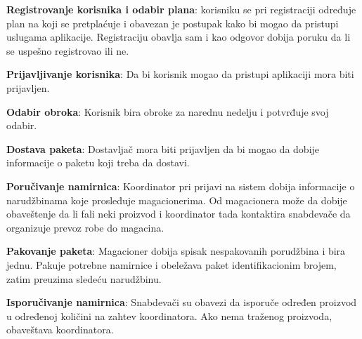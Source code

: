 	\textbf{Registrovanje korisnika i odabir plana}: korisniku se pri registraciji određuje plan na koji se pretplaćuje i obavezan je postupak kako bi mogao da pristupi uslugama aplikacije. Registraciju obavlja sam i kao odgovor dobija poruku da li se uspešno registrovao ili ne.
	
	\textbf{Prijavljivanje korisnika}: Da bi korisnik mogao da pristupi aplikaciji mora biti prijavljen.
		
	\textbf{Odabir obroka}: Korisnik bira obroke za narednu nedelju i potvrđuje svoj odabir.
	
	
	\textbf{Dostava paketa}: Dostavljač mora biti prijavljen da bi mogao da dobije informacije o paketu koji treba da dostavi. 
	
	
	\textbf{Poručivanje namirnica}: Koordinator pri prijavi na sistem dobija informacije o narudžbinama koje prosleđuje magacionerima. Od magacionera može da dobije obaveštenje da li fali neki proizvod i koordinator tada kontaktira snabdevače da organizuje prevoz robe do magacina. 
	
	\textbf{Pakovanje paketa}: Magacioner dobija spisak nespakovanih porudžbina i bira jednu. Pakuje potrebne namirnice i obeležava paket identifikacionim brojem, zatim preuzima sledeću narudžbinu.
	
	\textbf{Isporučivanje namirnica}: Snabdevači su obavezi da isporuče određen proizvod u određenoj količini na zahtev koordinatora. Ako nema traženog proizvoda, obaveštava koordinatora.
	